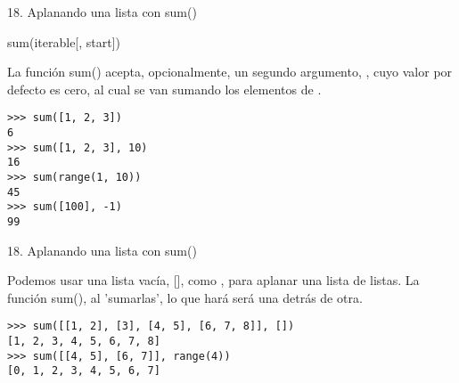 
\begin{frame}[fragile]{18. Aplanando una lista con sum()}
  \begin{block}{}
    \centering \LARGE sum(iterable[, start])
  \end{block}

  \small
  \begin{center}
    \centering
    La función sum() acepta, opcionalmente, un segundo argumento,
    , cuyo valor por defecto es cero, al cual se van
    sumando los elementos de .
  \end{center}

  \footnotesize
  \begin{exampleblock}{}
    \begin{lstlisting}
>>> sum([1, 2, 3])
6
>>> sum([1, 2, 3], 10)
16
>>> sum(range(1, 10))
45
>>> sum([100], -1)
99
    \end{lstlisting}
  \end{exampleblock}
\end{frame}

\begin{frame}[fragile]{18. Aplanando una lista con sum()}
  \begin{block}{}
    \centering
    Podemos usar una lista vacía, [], como , para aplanar
    una lista de listas. La función sum(), al 'sumarlas', lo que hará será
     una detrás de otra.
  \end{block}

  \small
  \begin{exampleblock}{}
    \begin{lstlisting}
>>> sum([[1, 2], [3], [4, 5], [6, 7, 8]], [])
[1, 2, 3, 4, 5, 6, 7, 8]
>>> sum([[4, 5], [6, 7]], range(4))
[0, 1, 2, 3, 4, 5, 6, 7]
    \end{lstlisting}
  \end{exampleblock}
\end{frame}


